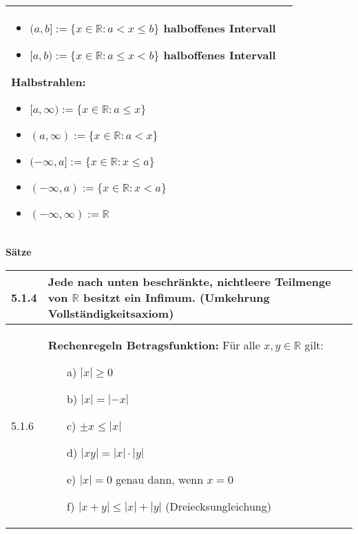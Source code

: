 \begin{table}[H]
\begin{tabularx}{\textwidth}{X m{16cm}}
\begin{itemize}[topsep=-0.5cm]
                \item $(a,b]:= \{x \in \mathbb{R}: a < x \leq b\}$ halboffenes Intervall
                \item $[a,b):= \{x \in \mathbb{R}: a \leq x < b\}$ halboffenes Intervall
            \end{itemize} \vspace{-0cm} \hfill \break
            \textbf{Halbstrahlen:}
            \begin{itemize}[topsep=-0.5cm]
                \item $[a,\infty) := \{x \in \mathbb{R} : a \leq x\}$
                \item $(a, \infty) := \{x \in \mathbb{R} : a < x\}$
                \item $(-\infty, a] := \{x \in \mathbb{R}: x \leq a\}$
                \item $(-\infty,a) := \{x \in \mathbb{R} : x < a\}$
                \item $(-\infty,\infty):= \mathbb{R}$
            \end{itemize} \vspace{-0cm} \\
    \bottomrule
    
\end{tabularx}
\end{table}

\noindent
\textbf{Sätze}
\begin{table}[H]
\begin{tabularx}{\textwidth}{X m{16cm}}
    \toprule

    5.1.4 & Jede nach unten beschränkte, nichtleere Teilmenge von $\mathbb{R}$ besitzt ein Infimum. \linebreak
            (Umkehrung Vollständigkeitsaxiom) \\
    \midrule
    5.1.6 & \textbf{Rechenregeln Betragsfunktion:} \hfill \break
            Für alle $x,y \in \mathbb{R}$ gilt: 
            \begin{itemize}[topsep=-0.5cm]
                \item[a)] $|x| \geq 0$
                \item[b)] $|x| = |-x|$
                \item[c)] $\pm x \leq |x|$
                \item[d)] $|xy| = |x| \cdot |y|$
                \item[e)] $|x| = 0$ genau dann, wenn $x = 0$
                \item[f)] $|x+y| \leq |x| + |y|$ (Dreiecksungleichung)  
            \end{itemize} \vspace{-0cm} \\

    

    \bottomrule
\end{tabularx}
\end{table}

